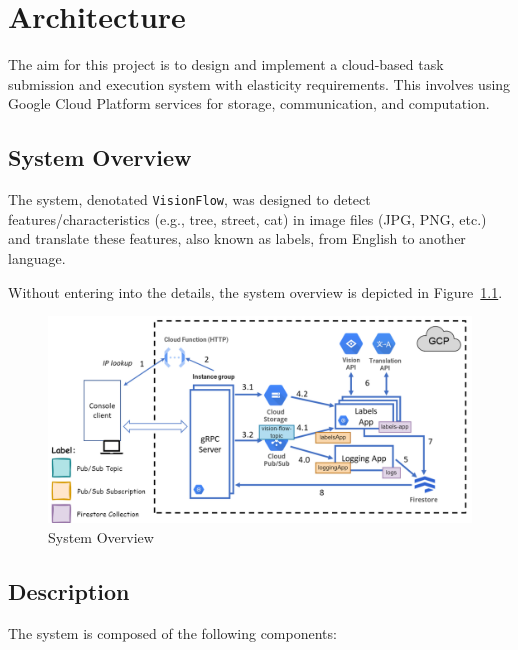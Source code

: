 \chapter{Architecture}\label{ch:architecture}

The aim for this project is to design and implement a cloud-based task submission and execution system with elasticity requirements.
This involves using Google Cloud Platform services for storage, communication, and computation.


\section{System Overview}\label{sec:system-overview}

The system, denotated \texttt{VisionFlow},
was designed to detect features/characteristics (e.g., tree, street, cat)
in image files (JPG, PNG, etc.) and translate these features, also known as labels, from English to another language.

Without entering into the details, the system overview is depicted in Figure~\ref{fig:system-architecture}.

\begin{figure}[!htb]
    \centering
    \includegraphics[width=1\textwidth]{../figures/system-architecture}
    \caption{System Overview}
    \label{fig:system-architecture}
\end{figure}


\section{Description}\label{sec:system-description}

The system is composed of the following components:

